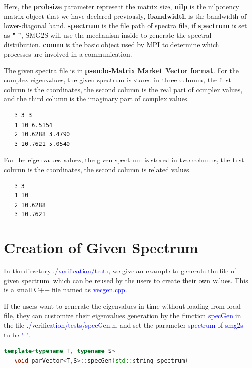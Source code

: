 \documentclass[a4paper, 10 pt]{report}
\begin{document}
	Here, the \textbf{probsize} parameter represent the matrix size, \textbf{nilp} is the nilpotency matrix object that we have declared previously, \textbf{lbandwidth} is the bandwidth of lower-diagonal band. \textbf{spectrum} is the file path of spectra file, if \textbf{spectrum} is set as \textbf{" "}, SMG2S will use the mechanism inside to generate the spectral distribution. \textbf{comm} is the basic object used by MPI to determine which processes are involved in a communication.
	
	The given spectra file is in \textbf{pseudo-Matrix Market Vector format}. For the complex eigenvalues, the given spectrum is stored in three columns, the first column is the coordinates, the second column is the real part of complex values, and the third column is the imaginary part of complex values.

	\begin{lstlisting}[language=bash,frame=single]
   %%MatrixMarket matrix coordinate complex general
   3 3 3
   1 10 6.5154
   2 10.6288 3.4790
   3 10.7621 5.0540
	\end{lstlisting}

For the eigenvalues values, the given spectrum is stored in two columns, the first column is the coordinates, the second column is related values.
	\begin{lstlisting}[language=bash,frame=single]
   %%MatrixMarket matrix coordinate complex general
   3 3
   1 10
   2 10.6288
   3 10.7621
\end{lstlisting}

\section{Creation of Given Spectrum}
In the directory \textcolor{blue}{./verification/tests}, we give an example to generate the file of given spectrum, which can be reused by the users to create their own values. This is a small C++ file named as \textcolor{blue}{vecgen.cpp}.

If the users want to generate the eigenvalues in time without loading from local file, they can customize their eigenvalues generation by the function \textcolor{blue}{specGen} in the file \textcolor{blue}{./verification/tests/specGen.h}, and set the parameter \textcolor{blue}{spectrum} of \textcolor{blue}{smg2s} to be \textcolor{blue}{" "}.

	\begin{lstlisting}[language=C++,frame=single]
   template<typename T, typename S>
   void parVector<T,S>::specGen(std::string spectrum)
\end{lstlisting}
\end{document}
